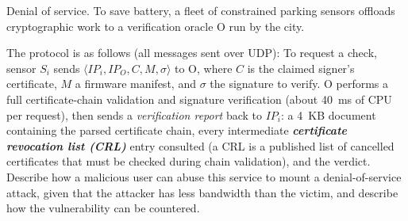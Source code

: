 \documentclass[12pt, a4paper]{article}
\newcommand{\term}[1]{\textbf{\textit{#1}}}        %
\begin{document}
\begin{problembox}
Denial of service. To save battery, a fleet of constrained parking sensors offloads cryptographic work to a verification oracle O run by the city.

The protocol is as follows (all messages sent over UDP): To request a check, sensor $S_i$ sends $\langle IP_i, IP_O, C, M, \sigma \rangle$ to O, where $C$ is the claimed signer's certificate, $M$ a firmware manifest, and $\sigma$ the signature to verify.
O performs a full certificate-chain validation and signature verification (about 40~ms of CPU per request), then sends a \emph{verification report} back to $IP_i$: a 4~KB document containing the parsed certificate chain, every intermediate \term{certificate revocation list (CRL)} entry consulted (a CRL is a published list of cancelled certificates that must be checked during chain validation), and the verdict.
Describe how a malicious user can abuse this service to mount a denial-of-service attack, given that the attacker has less bandwidth than the victim, and describe how the vulnerability can be countered.
\end{problembox}
\end{document}
